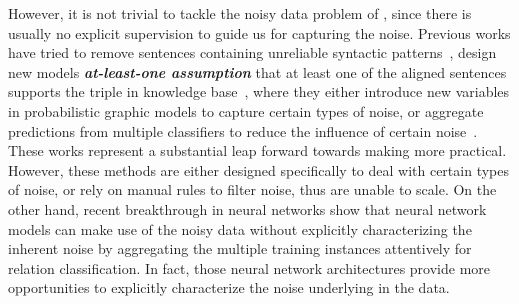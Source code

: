 However, it is not trivial to tackle the noisy data problem of \DS, since there is usually no explicit supervision to guide us for capturing the noise.
Previous works have tried to remove sentences containing unreliable syntactic patterns~\cite{takamatsu2012reducing}, design new models  \textbf{\textit{at-least-one assumption}}  that at least one of the aligned sentences supports the triple in knowledge base~\cite{riedel2010modeling}, where they either introduce new variables in probabilistic graphic models to capture certain types of noise, or aggregate predictions from multiple classifiers to reduce the influence of certain noise~\cite{hoffmann2011knowledge,surdeanu2012multi,ritter2013modeling,min2013distant}. These works represent a substantial leap forward towards making \DS more practical. However, these methods are either designed specifically to deal with certain types of noise, 
or rely on manual rules to filter noise, thus are unable to scale.
On the other hand, recent breakthrough in neural networks show that neural network models can make use of the noisy data without explicitly characterizing the inherent noise by aggregating the multiple training instances attentively for relation classification.
In fact, those neural network architectures provide more opportunities to explicitly characterize the noise underlying in the data.




